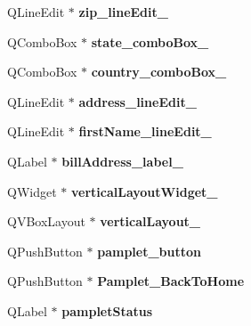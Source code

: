 \begin{DoxyCompactItemize}
Q\+Line\+Edit $\ast$ {\bfseries zip\+\_\+line\+Edit\+\_}
\item 
\mbox{\label{class_ui___main_interface_a312d0f9520243b4b5d79712a15ec22b9}} 
Q\+Combo\+Box $\ast$ {\bfseries state\+\_\+combo\+Box\+\_}
\item 
\mbox{\label{class_ui___main_interface_a2083eb95d078391cdb943c352c968b8f}} 
Q\+Combo\+Box $\ast$ {\bfseries country\+\_\+combo\+Box\+\_}
\item 
\mbox{\label{class_ui___main_interface_a31d3fee2b24b744e4b4207f10498da05}} 
Q\+Line\+Edit $\ast$ {\bfseries address\+\_\+line\+Edit\+\_}
\item 
\mbox{\label{class_ui___main_interface_aefe9fd30d37a1e343b57146346483763}} 
Q\+Line\+Edit $\ast$ {\bfseries first\+Name\+\_\+line\+Edit\+\_}
\item 
\mbox{\label{class_ui___main_interface_a5a497955c740dddb7d3f1c7276ee05e1}} 
Q\+Label $\ast$ {\bfseries bill\+Address\+\_\+label\+\_}
\item 
\mbox{\label{class_ui___main_interface_a5777a5ff6d2d2890d5b552683e5639db}} 
Q\+Widget $\ast$ {\bfseries vertical\+Layout\+Widget\+\_}
\item 
\mbox{\label{class_ui___main_interface_af0420f1e6fc50e8ed78e2e55f1b28070}} 
Q\+V\+Box\+Layout $\ast$ {\bfseries vertical\+Layout\+\_}
\item 
\mbox{\label{class_ui___main_interface_a7fcff6ec6c40bab2f87f43f271c71fff}} 
Q\+Push\+Button $\ast$ {\bfseries pamplet\+\_\+button}
\item 
\mbox{\label{class_ui___main_interface_a48b301863e1e7f675522f73766fb31d6}} 
Q\+Push\+Button $\ast$ {\bfseries Pamplet\+\_\+\+Back\+To\+Home}
\item 
\mbox{\label{class_ui___main_interface_ad9fd2aee9a364e456dcca21e1838fb57}} 
Q\+Label $\ast$ {\bfseries pamplet\+Status}

\end{DoxyCompactItemize}
